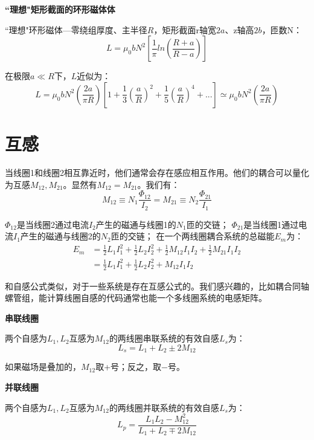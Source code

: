 \textbf{``理想"矩形截面的环形磁体体}

``理想"环形磁体---零绕组厚度、主半径$R$，矩形截面r轴宽$2a$、z轴高$2b$，匝数N：
  \begin{equation}
L=\mu_0bN^2[\frac{1}{\pi}ln(\frac{R+a}{R-a})]%
\end{equation}

在极限$a\ll R$下，$L$近似为：
\begin{equation*}
L=\mu_0bN^2(\frac{2a}{\pi R})[1+\frac{1}{3}(\frac{a}{R})^2+\frac{1}{5}(\frac{a}{R})^4+...]\simeq\mu_0bN^2(\frac{2a}{\pi R}) \tag{3.90'}%
\end{equation*}



\section{互感}
当线圈1和线圈2相互靠近时，他们通常会存在感应相互作用。他们的耦合可以量化为互感$M_{12},M_{21}$。显然有$M_{12}=M_{21}$。我们有：
\begin{equation}
M_{12}\equiv N_1\frac{\Phi_{12}}{I_2}=M_{21}\equiv N_2\frac{\Phi_{21}}{I_1}%
\end{equation}

$\Phi_{12}$是当线圈2通过电流$I_2$产生的磁通与线圈1的$N_1$匝的交链；
$\Phi_{21}$是当线圈1通过电流$I_1$产生的磁通与线圈2的$N_2$匝的交链；
在一个两线圈耦合系统的总磁能$E_m$为：
\begin{equation}
\begin{split}
E_m&=\frac{1}{2}L_1I_1^2+\frac{1}{2}L_2I_2^2+\frac{1}{2}M_{12}I_1I_2+\frac{1}{2}M_{21}I_1I_2\\
&= \frac{1}{2}L_1I_1^2+\frac{1}{2}L_2I_2^2+M_{12}I_1I_2%
\end{split}
\end{equation}

和自感公式类似，对于一些系统是存在互感公式的。我们感兴趣的，比如耦合同轴螺管组，能计算线圈自感的代码通常也能一个多线圈系统的电感矩阵。

\textbf{串联线圈} 
  
  两个自感为$L_1,L_2$互感为$M_{12}$的两线圈串联系统的有效自感$L_s$为：
  \begin{equation}
   L_s=L_1+L_2 \pm 2M_{12}%
  \end{equation}

如果磁场是叠加的，$M_{12}$取+号；反之，取−号。

\textbf{并联线圈} 

两个自感为$L_1,L_2$互感为$M_{12}$的两线圈并联系统的有效自感$L_s$为：
  \begin{equation}
L_p=\frac{L_1 L_2-M_{12}^2}{L_1+L_2 \mp 2M_{12}}%
\end{equation}

